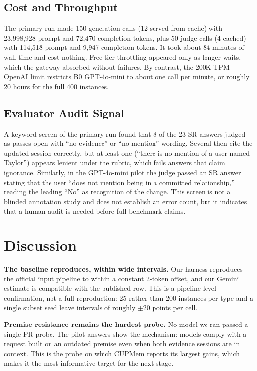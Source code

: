 \documentclass[conference]{IEEEtran}
\begin{document}
\subsection{Cost and Throughput}
The primary run made 150 generation calls (12 served from cache) with 23{,}998{,}928 prompt and 72{,}470 completion tokens, plus 50 judge calls (4 cached) with 114{,}518 prompt and 9{,}947 completion tokens. It took about 84 minutes of wall time and cost nothing. Free-tier throttling appeared only as longer waits, which the gateway absorbed without failures. By contrast, the 200K-TPM OpenAI limit restricts B0 GPT-4o-mini to about one call per minute, or roughly 20 hours for the full 400 instances.

\subsection{Evaluator Audit Signal}\label{sec:audit}
A keyword screen of the primary run found that 8 of the 23 SR answers judged as passes open with ``no evidence'' or ``no mention'' wording. Several then cite the updated session correctly, but at least one (``there is no mention of a user named Taylor'') appears lenient under the rubric, which fails answers that claim ignorance. Similarly, in the GPT-4o-mini pilot the judge passed an SR answer stating that the user ``does not mention being in a committed relationship,'' reading the leading ``No'' as recognition of the change. This screen is not a blinded annotation study and does not establish an error count, but it indicates that a human audit is needed before full-benchmark claims.

\section{Discussion}
\textbf{The baseline reproduces, within wide intervals.} Our harness reproduces the official input pipeline to within a constant 2-token offset, and our Gemini estimate is compatible with the published row. This is a pipeline-level confirmation, not a full reproduction: 25 rather than 200 instances per type and a single subset seed leave intervals of roughly $\pm 20$ points per cell.

\textbf{Premise resistance remains the hardest probe.} No model we ran passed a single PR probe. The pilot answers show the mechanism: models comply with a request built on an outdated premise even when both evidence sessions are in context. This is the probe on which CUPMem reports its largest gains, which makes it the most informative target for the next stage.
\end{document}
